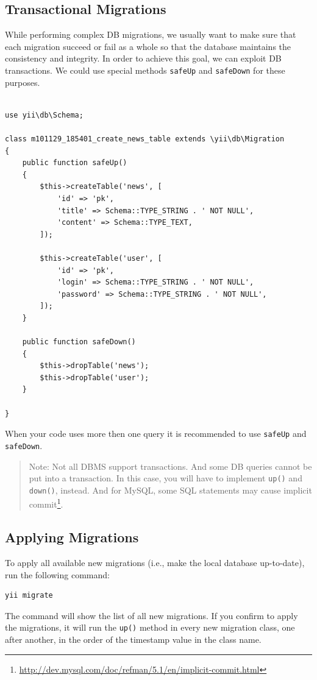 \subsection{Transactional Migrations}
While performing complex DB migrations, we usually want to make sure that each
migration succeed or fail as a whole so that the database maintains the
consistency and integrity. In order to achieve this goal, we can exploit
DB transactions. We could use special methods \lstinline|safeUp| and \lstinline|safeDown| for these purposes.

\lstset{language=php}\begin{lstlisting}

use yii\db\Schema;

class m101129_185401_create_news_table extends \yii\db\Migration
{
    public function safeUp()
    {
        $this->createTable('news', [
            'id' => 'pk',
            'title' => Schema::TYPE_STRING . ' NOT NULL',
            'content' => Schema::TYPE_TEXT,
        ]);

        $this->createTable('user', [
            'id' => 'pk',
            'login' => Schema::TYPE_STRING . ' NOT NULL',
            'password' => Schema::TYPE_STRING . ' NOT NULL',
        ]);
    }

    public function safeDown()
    {
        $this->dropTable('news');
        $this->dropTable('user');
    }

}
\end{lstlisting}
When your code uses more then one query it is recommended to use \lstinline|safeUp| and \lstinline|safeDown|.

\begin{quote}Note: Not all DBMS support transactions. And some DB queries cannot be put
into a transaction. In this case, you will have to implement \lstinline|up()| and
\lstinline|down()|, instead. And for MySQL, some SQL statements may cause
implicit commit\footnote{\url{http://dev.mysql.com/doc/refman/5.1/en/implicit-commit.html}}.

\end{quote}
\subsection{Applying Migrations}
To apply all available new migrations (i.e., make the local database up-to-date),
run the following command:

\begin{lstlisting}
yii migrate
\end{lstlisting}
The command will show the list of all new migrations. If you confirm to apply
the migrations, it will run the \lstinline|up()| method in every new migration class, one
after another, in the order of the timestamp value in the class name.

